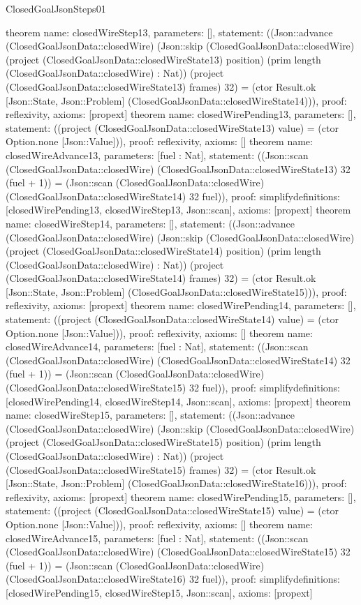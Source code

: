\begin{lexlean}{ClosedGoalJsonSteps01}
\begin{semanticmodule}
{}
theorem{
 name: closedWireStep13, parameters: [],
 statement: ((Json::advance (ClosedGoalJsonData::closedWire) (Json::skip (ClosedGoalJsonData::closedWire) (project (ClosedGoalJsonData::closedWireState13) position) (prim length (ClosedGoalJsonData::closedWire) : Nat)) (project (ClosedGoalJsonData::closedWireState13) frames) 32) = (ctor Result.ok [Json::State, Json::Problem] (ClosedGoalJsonData::closedWireState14))), proof: reflexivity{}, axioms: [propext]
}
theorem{
 name: closedWirePending13, parameters: [],
 statement: ((project (ClosedGoalJsonData::closedWireState13) value) = (ctor Option.none [Json::Value])), proof: reflexivity{}, axioms: []
}
theorem{
 name: closedWireAdvance13, parameters: [fuel : Nat],
 statement: ((Json::scan (ClosedGoalJsonData::closedWire) (ClosedGoalJsonData::closedWireState13) 32 (fuel + 1)) = (Json::scan (ClosedGoalJsonData::closedWire) (ClosedGoalJsonData::closedWireState14) 32 fuel)), proof: simplify{definitions: [closedWirePending13, closedWireStep13, Json::scan]}, axioms: [propext]
}
theorem{
 name: closedWireStep14, parameters: [],
 statement: ((Json::advance (ClosedGoalJsonData::closedWire) (Json::skip (ClosedGoalJsonData::closedWire) (project (ClosedGoalJsonData::closedWireState14) position) (prim length (ClosedGoalJsonData::closedWire) : Nat)) (project (ClosedGoalJsonData::closedWireState14) frames) 32) = (ctor Result.ok [Json::State, Json::Problem] (ClosedGoalJsonData::closedWireState15))), proof: reflexivity{}, axioms: [propext]
}
theorem{
 name: closedWirePending14, parameters: [],
 statement: ((project (ClosedGoalJsonData::closedWireState14) value) = (ctor Option.none [Json::Value])), proof: reflexivity{}, axioms: []
}
theorem{
 name: closedWireAdvance14, parameters: [fuel : Nat],
 statement: ((Json::scan (ClosedGoalJsonData::closedWire) (ClosedGoalJsonData::closedWireState14) 32 (fuel + 1)) = (Json::scan (ClosedGoalJsonData::closedWire) (ClosedGoalJsonData::closedWireState15) 32 fuel)), proof: simplify{definitions: [closedWirePending14, closedWireStep14, Json::scan]}, axioms: [propext]
}
theorem{
 name: closedWireStep15, parameters: [],
 statement: ((Json::advance (ClosedGoalJsonData::closedWire) (Json::skip (ClosedGoalJsonData::closedWire) (project (ClosedGoalJsonData::closedWireState15) position) (prim length (ClosedGoalJsonData::closedWire) : Nat)) (project (ClosedGoalJsonData::closedWireState15) frames) 32) = (ctor Result.ok [Json::State, Json::Problem] (ClosedGoalJsonData::closedWireState16))), proof: reflexivity{}, axioms: [propext]
}
theorem{
 name: closedWirePending15, parameters: [],
 statement: ((project (ClosedGoalJsonData::closedWireState15) value) = (ctor Option.none [Json::Value])), proof: reflexivity{}, axioms: []
}
theorem{
 name: closedWireAdvance15, parameters: [fuel : Nat],
 statement: ((Json::scan (ClosedGoalJsonData::closedWire) (ClosedGoalJsonData::closedWireState15) 32 (fuel + 1)) = (Json::scan (ClosedGoalJsonData::closedWire) (ClosedGoalJsonData::closedWireState16) 32 fuel)), proof: simplify{definitions: [closedWirePending15, closedWireStep15, Json::scan]}, axioms: [propext]
}
\end{semanticmodule}
\end{lexlean}
